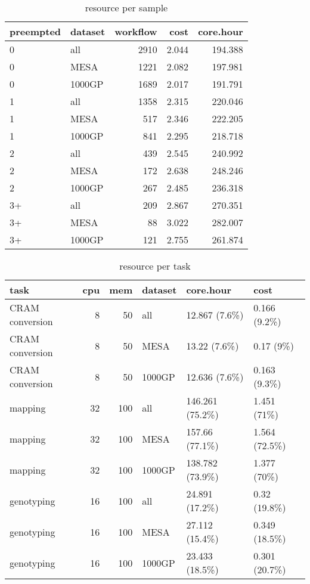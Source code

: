 \begin{table}

\caption{\label{tab:unnamed-chunk-5}resource per sample}
\centering
\begin{tabular}[t]{l|l|r|r|r}
\hline
preempted & dataset & workflow & cost & core.hour\\
\hline
0 & all & 2910 & 2.044 & 194.388\\
\hline
0 & MESA & 1221 & 2.082 & 197.981\\
\hline
0 & 1000GP & 1689 & 2.017 & 191.791\\
\hline
1 & all & 1358 & 2.315 & 220.046\\
\hline
1 & MESA & 517 & 2.346 & 222.205\\
\hline
1 & 1000GP & 841 & 2.295 & 218.718\\
\hline
2 & all & 439 & 2.545 & 240.992\\
\hline
2 & MESA & 172 & 2.638 & 248.246\\
\hline
2 & 1000GP & 267 & 2.485 & 236.318\\
\hline
3+ & all & 209 & 2.867 & 270.351\\
\hline
3+ & MESA & 88 & 3.022 & 282.007\\
\hline
3+ & 1000GP & 121 & 2.755 & 261.874\\
\hline
\end{tabular}
\end{table}

\begin{table}

\caption{\label{tab:unnamed-chunk-5}resource per task}
\centering
\begin{tabular}[t]{l|r|r|l|l|l}
\hline
task & cpu & mem & dataset & core.hour & cost\\
\hline
CRAM conversion & 8 & 50 & all & 12.867 (7.6\%) & 0.166 (9.2\%)\\
\hline
CRAM conversion & 8 & 50 & MESA & 13.22 (7.6\%) & 0.17 (9\%)\\
\hline
CRAM conversion & 8 & 50 & 1000GP & 12.636 (7.6\%) & 0.163 (9.3\%)\\
\hline
mapping & 32 & 100 & all & 146.261 (75.2\%) & 1.451 (71\%)\\
\hline
mapping & 32 & 100 & MESA & 157.66 (77.1\%) & 1.564 (72.5\%)\\
\hline
mapping & 32 & 100 & 1000GP & 138.782 (73.9\%) & 1.377 (70\%)\\
\hline
genotyping & 16 & 100 & all & 24.891 (17.2\%) & 0.32 (19.8\%)\\
\hline
genotyping & 16 & 100 & MESA & 27.112 (15.4\%) & 0.349 (18.5\%)\\
\hline
genotyping & 16 & 100 & 1000GP & 23.433 (18.5\%) & 0.301 (20.7\%)\\
\hline
\end{tabular}
\end{table}